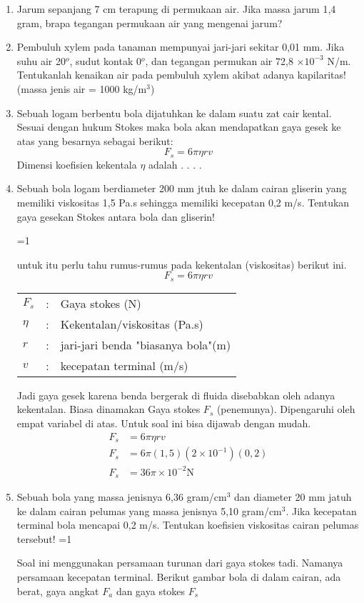 \documentclass[14pt,a4paper]{extarticle}
\def\tampilkunci{0}
\newcommand{\hide}[1]{\ifnum\tampilkunci=1
%
\begin{mybox}
 #1
\end{mybox}
%
\vspace{\baselineskip}\fi}
\newcommand{\pers}[1]{\begin{align*} #1 \end{align*}}
\newcommand{\sci}[1]{$\times 10^{#1}$}
\newcommand{\scip}[1]{\times 10^{#1}}
\begin{document}
\begin{enumerate}[itemsep=0mm]


\item Jarum sepanjang 7 cm terapung di permukaan air. Jika massa jarum 1,4 gram, brapa tegangan permukaan air yang mengenai jarum?


\item Pembuluh xylem pada tanaman mempunyai jari-jari sekitar 0,01 mm. Jika suhu air 20$^o$, sudut kontak 0$^o$, dan tegangan permukan air 72,8 \sci{-3} N/m. Tentukanlah kenaikan air pada pembuluh xylem akibat adanya kapilaritas! (massa jenis air  = 1000 kg/m$^3$)

\item Sebuah logam berbentu bola dijatuhkan ke dalam suatu zat cair kental. Sesuai dengan hukum Stokes maka bola akan mendapatkan gaya gesek ke atas yang besarnya sebagai berikut:
$$ F_s = 6 \pi \eta r v $$
Dimensi koefisien kekentala $\eta$ adalah . . . .

 

\item Sebuah bola logam berdiameter 200 mm jtuh ke dalam cairan gliserin yang memiliki viskositas 1,5 Pa.s sehingga memiliki kecepatan 0,2 m/s. Tentukan gaya gesekan Stokes antara bola dan gliserin!

\hide{
untuk itu perlu tahu rumus-rumus pada kekentalan (viskositas) berikut ini.
$$F_s= 6 \pi \eta r v $$
\begin{tabular}{lcl}
$F_s$ &:& Gaya stokes (N) \\
$\eta$ &:& Kekentalan/viskositas (Pa.s)\\
$r$ &:& jari-jari benda "biasanya bola"(m) \\
$v$ &:& kecepatan terminal (m/s) \\
\end{tabular}

Jadi gaya gesek karena benda bergerak di fluida disebabkan oleh adanya kekentalan. Biasa dinamakan Gaya stokes $F_s$ (penemunya). Dipengaruhi oleh empat variabel di atas. Untuk soal ini bisa dijawab dengan mudah.
\pers{
F_s&=6\pi \eta r v \\
F_s&=6\pi (1,5)(2\scip{-1})(0,2)\\
F_s&=36 \pi \scip{-2} \text{N}
} 
}

\item Sebuah bola yang massa jenisnya 6,36 gram/cm$^3$ dan diameter 20 mm jatuh ke dalam cairan pelumas yang massa jenisnya 5,10 gram/cm$^3$. Jika kecepatan terminal bola mencapai 0,2 m/s. Tentukan koefisien viskositas cairan pelumas tersebut!
\hide{
Soal ini menggunakan persamaan turunan dari gaya stokes tadi. Namanya persamaan kecepatan terminal. Berikut gambar bola di dalam cairan, ada berat, gaya angkat $F_a$ dan gaya stokes $F_s$

}
\end{enumerate}
\end{document}
